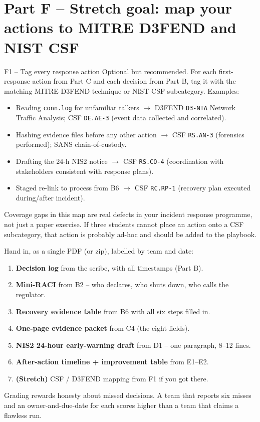 \documentclass[11pt,a4paper]{article}
\begin{document}
\section*{Part F -- Stretch goal: map your actions to MITRE D3FEND and NIST CSF}

\begin{stepbox}{F1 -- Tag every response action}
Optional but recommended. For each first-response action from Part C and each decision from Part B, tag it with the matching MITRE D3FEND technique or NIST CSF subcategory. Examples:
\begin{itemize}\setlength{\itemsep}{1pt}
  \item Reading \texttt{conn.log} for unfamiliar talkers $\to$ D3FEND \texttt{D3-NTA} Network Traffic Analysis; CSF \texttt{DE.AE-3} (event data collected and correlated).
  \item Hashing evidence files before any other action $\to$ CSF \texttt{RS.AN-3} (forensics performed); SANS chain-of-custody.
  \item Drafting the 24-h NIS2 notice $\to$ CSF \texttt{RS.CO-4} (coordination with stakeholders consistent with response plans).
  \item Staged re-link to process from B6 $\to$ CSF \texttt{RC.RP-1} (recovery plan executed during/after incident).
\end{itemize}
Coverage gaps in this map are real defects in your incident response programme, not just a paper exercise. If three students cannot place an action onto a CSF subcategory, that action is probably ad-hoc and should be added to the playbook.
\end{stepbox}

\begin{deliverbox}
Hand in, as a single PDF (or zip), labelled by team and date:
\begin{enumerate}\setlength{\itemsep}{1pt}
  \item \textbf{Decision log} from the scribe, with all timestamps (Part B).
  \item \textbf{Mini-RACI} from B2 -- who declares, who shuts down, who calls the regulator.
  \item \textbf{Recovery evidence table} from B6 with all six steps filled in.
  \item \textbf{One-page evidence packet} from C4 (the eight fields).
  \item \textbf{NIS2 24-hour early-warning draft} from D1 -- one paragraph, 8--12 lines.
  \item \textbf{After-action timeline + improvement table} from E1--E2.
  \item \textbf{(Stretch)} CSF / D3FEND mapping from F1 if you got there.
\end{enumerate}
Grading rewards honesty about missed decisions. A team that reports six misses and an owner-and-due-date for each scores higher than a team that claims a flawless run.
\end{deliverbox}
\end{document}
